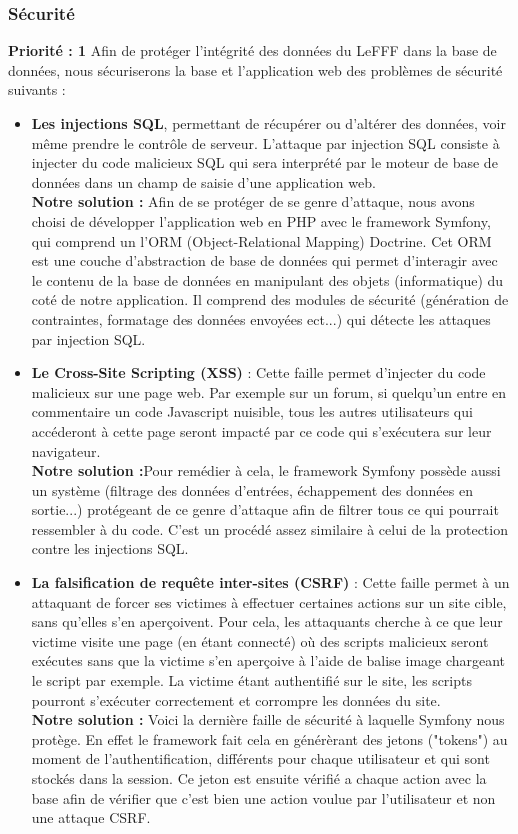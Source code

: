 \documentclass[12pt,a4paper]{article}
\begin{document}
\subsubsection{Sécurité}
\textbf{Priorité : 1}
\smallbreak
Afin de protéger l'intégrité des données du LeFFF dans la base de données, nous sécuriserons la base et l'application web des problèmes de sécurité suivants :
\begin{itemize}
    \item \textbf{Les injections SQL}, permettant de récupérer ou d'altérer des données, voir même prendre le contrôle de serveur. L'attaque par injection SQL consiste à injecter du code malicieux SQL qui sera interprété par le moteur de base de données dans un champ de saisie d'une application web. \\
    \textbf{Notre solution :} Afin de se protéger de se genre d'attaque, nous avons choisi de développer l'application web en PHP avec le framework Symfony, qui comprend un l'ORM (Object-Relational Mapping) Doctrine. Cet ORM est une couche d'abstraction de base de données qui permet d'interagir avec le contenu de la base de données en manipulant des objets (informatique) du coté de notre application. Il comprend des modules de sécurité (génération de contraintes, formatage des données envoyées ect...) qui détecte les attaques par injection SQL.
    
    \item \textbf{Le Cross-Site Scripting (XSS)} : Cette faille permet d'injecter du code malicieux sur une page web. Par exemple sur un forum, si quelqu'un entre en commentaire un code Javascript nuisible, tous les autres utilisateurs qui accéderont à cette page seront impacté par ce code qui s'exécutera sur leur navigateur. \\
    \textbf{Notre solution :}Pour remédier à cela, le framework Symfony possède aussi un système (filtrage des données d'entrées, échappement des données en sortie...) protégeant de ce genre d'attaque afin de filtrer tous ce qui pourrait ressembler à du code. C'est un procédé assez similaire à celui de la protection contre les injections SQL.
    
    \item \textbf{La falsification de requête inter-sites (CSRF)} : Cette faille permet à un attaquant de forcer ses victimes à effectuer certaines actions sur un site cible, sans qu'elles s'en aperçoivent. Pour cela, les attaquants cherche à ce que leur victime visite une page (en étant connecté) où des scripts malicieux seront exécutes sans que la victime s'en aperçoive à l'aide de balise image chargeant le script par exemple. La victime étant authentifié sur le site, les scripts pourront s'exécuter correctement et corrompre les données du site. \\
    \textbf{Notre solution :} Voici la dernière faille de sécurité à laquelle Symfony nous protège. En effet le framework fait cela en générèrant des jetons ("tokens") au moment de l'authentification, différents pour chaque utilisateur et qui sont stockés dans la session. Ce jeton est ensuite vérifié a chaque action avec la base afin de vérifier que c'est bien une action voulue par l'utilisateur et non une attaque CSRF. 
    

\end{itemize}
\end{document}
